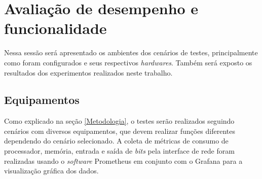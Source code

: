 \section{Avaliação de desempenho e funcionalidade}
Nessa sessão será apresentado os ambientes dos cenários de testes, principalmente como foram configurados e seus respectivos \textit{hardwares}. Também será exposto os resultados dos experimentos realizados neste trabalho.
\subsection{Equipamentos}

Como explicado na seção \ref{Metodologia}, o testes serão realizados seguindo cenários com diversos equipamentos, que devem realizar funções diferentes dependendo do cenário selecionado.
A coleta de métricas de consumo de processador, memória, entrada e saída de \textit{bits} pela interface de rede
foram realizadas usando o \textit{software} Prometheus em conjunto com o Grafana para a visualização gráfica dos dados.

